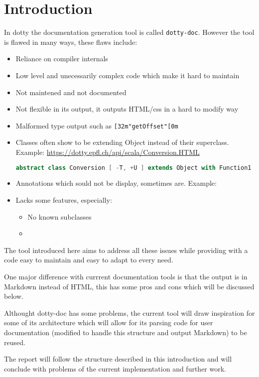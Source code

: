 \documentclass{report}
\begin{document}
\chapter{Introduction}
In dotty the documentation generation tool is called \texttt{dotty-doc}. However the tool is flawed in many ways, these flaws include:
\begin{itemize}
    \item Reliance on compiler internals
    \item Low level and unecessarily complex code which make it hard to maintain
    \item Not maintened and not documented
    \item Not flexible in its output, it outputs HTML/css in a hard to modify way
    \item Malformed type output such as \texttt{[32m"getOffset"[0m}
    \item Classes often show to be extending Object instead of their superclass. Example: \url{https://dotty.epfl.ch/api/scala/Conversion.HTML}
\begin{lstlisting}[language=scala]
abstract class Conversion [ -T, +U ] extends Object with Function1
\end{lstlisting}
    \item Annotations which sould not be display, sometimes are. Example:
    \item Lacks some features, especially:
    \begin{itemize}
        \item No known subclasses
        \item 
    \end{itemize}
\end{itemize}

The tool introduced here aims to address all these issues while providing with a code easy to maintain and easy to adapt to every need.

One major difference with currrent documentation tools is that the output is in Markdown instead of HTML, this has some pros and cons which will be discussed below.

Althought dotty-doc has some problems, the current tool will draw inspiration for some of its architecture which will allow for its parsing code for user documentation (modified to handle this structure and output Markdown) to be reused.

The report will follow the structure described in this introduction and will conclude with problems of the current implementation and further work.
\end{document}
